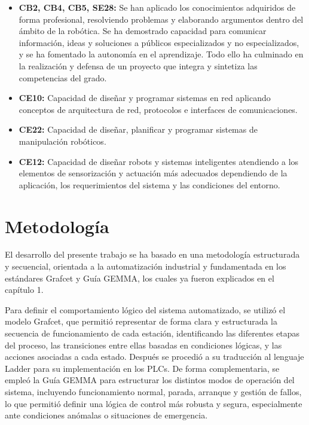 \begin{itemize}
	\item \textbf{CB2, CB4, CB5, SE28:} Se han aplicado los conocimientos adquiridos de forma profesional, resolviendo problemas y elaborando argumentos dentro del ámbito de la robótica. Se ha demostrado capacidad para comunicar información, ideas y soluciones a públicos especializados y no especializados, y se ha fomentado la autonomía en el aprendizaje. Todo ello ha culminado en la realización y defensa de un proyecto que integra y sintetiza las competencias del grado.

	\item \textbf{CE10:} Capacidad de diseñar y programar sistemas en red aplicando conceptos de arquitectura de red, protocolos e interfaces de comunicaciones.

	\item \textbf{CE22:} Capacidad de diseñar, planificar y programar sistemas de manipulación robóticos.

	\item \textbf{CE12:} Capacidad de diseñar robots y sistemas inteligentes atendiendo a los elementos de sensorización y actuación más adecuados dependiendo de la aplicación, los requerimientos del sistema y las condiciones del entorno.

\end{itemize}
 
\section{Metodología}
\label{sec:metodologia}

El desarrollo del presente trabajo se ha basado en una metodología estructurada y secuencial, orientada a la automatización industrial y fundamentada en los estándares Grafcet y Guía GEMMA, los cuales ya fueron explicados en el capítulo 1.

Para definir el comportamiento lógico del sistema automatizado, se utilizó el modelo Grafcet, que permitió representar de forma clara y estructurada la secuencia de funcionamiento de cada estación, identificando las diferentes etapas del proceso, las transiciones entre ellas basadas en condiciones lógicas, y las acciones asociadas a cada estado. Después se procedió a su traducción al lenguaje Ladder para su implementación en los PLCs. De forma complementaria, se empleó la Guía GEMMA para estructurar los distintos modos de operación del sistema, incluyendo funcionamiento normal, parada, arranque y gestión de fallos, lo que permitió definir una lógica de control más robusta y segura, especialmente ante condiciones anómalas o situaciones de emergencia.

